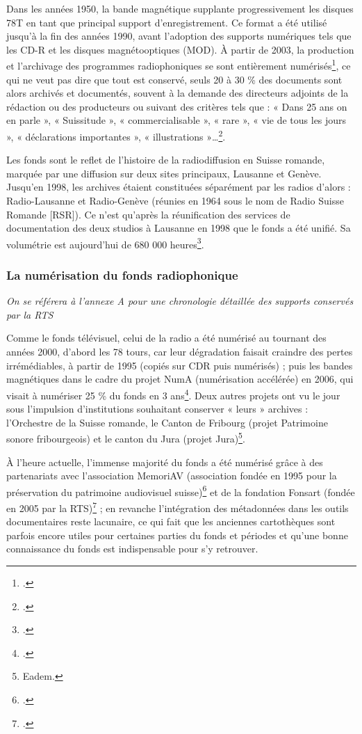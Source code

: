Dans les années 1950, la bande magnétique supplante progressivement les disques 78T en tant que principal support d’enregistrement. Ce format a été utilisé jusqu’à la fin des années 1990, avant l’adoption des supports numériques tels que les CD-R et les disques magnétooptiques (MOD). À partir de 2003, la production et l’archivage des programmes radiophoniques se sont entièrement numérisés\footcite[p. 27]{prongue2009}, ce qui ne veut pas dire que tout est conservé, seuls 20 à 30 \% des documents sont alors archivés et documentés, souvent à la demande des directeurs adjoints de la rédaction ou des producteurs ou suivant des critères tels que : « Dans 25 ans on en parle », « Suissitude », « commercialisable », « rare », « vie de tous les jours », « déclarations importantes », « illustrations »…\footcite{meuret2024}.

Les fonds sont le reflet de l’histoire de la radiodiffusion en Suisse romande, marquée par une diffusion sur deux sites principaux, Lausanne et Genève. Jusqu’en 1998, les archives étaient constituées séparément par les radios d’alors : Radio-Lausanne et Radio-Genève (réunies en 1964 sous le nom de Radio Suisse Romande [RSR]). Ce n’est qu’après la réunification des services de documentation des deux studios à Lausanne en 1998 que le fonds a été unifié. Sa volumétrie est aujourd’hui de 680 000 heures\footcite{sonderegger2024}.

\subsubsection{La numérisation du fonds radiophonique}
\textit{On se référera à l’annexe A pour une chronologie détaillée des supports conservés par la RTS}

Comme le fonds télévisuel, celui de la radio a été numérisé au tournant des années 2000, d’abord les 78 tours, car leur dégradation faisait craindre des pertes irrémédiables, à partir de 1995 (copiés sur CDR puis numérisés) ; puis les bandes magnétiques dans le cadre du projet NumA (numérisation accélérée) en 2006, qui visait à numériser 25 \% du fonds en 3 ans\footcite[p. 20]{prongue2009}. Deux autres projets ont vu le jour sous l’impulsion d’institutions souhaitant conserver « leurs » archives : l’Orchestre de la Suisse romande, le Canton de Fribourg (projet Patrimoine sonore fribourgeois) et le canton du Jura (projet Jura)\footnote{Eadem.}.

À l’heure actuelle, l’immense majorité du fonds a été numérisé grâce à des partenariats avec l’association MemoriAV (association fondée en 1995 pour la préservation du patrimoine audiovisuel suisse)\footcite{zotero-254} et de la fondation Fonsart (fondée en 2005 par la RTS)\footcite{freudiguer2024} ; en revanche l’intégration des métadonnées dans les outils documentaires reste lacunaire, ce qui fait que les anciennes cartothèques sont parfois encore utiles pour certaines parties du fonds et périodes et qu’une bonne connaissance du fonds est indispensable pour s’y retrouver.


